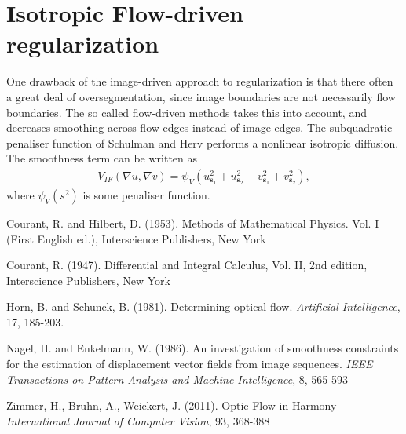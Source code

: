 \documentclass[10pt,a4paper]{article}
\begin{document}
\section{Isotropic Flow-driven regularization}
One drawback of the image-driven approach to regularization is that there often a great deal of oversegmentation, since image boundaries are not necessarily flow boundaries. The so called flow-driven methods takes this into account, and decreases smoothing across flow edges instead of image edges. The subquadratic penaliser function of Schulman and Herv performs a nonlinear isotropic diffusion. The smoothness term can be written as
\begin{align*}
V_{IF}(\nabla u, \nabla v) = \psi_V \left( u_{\textbf{s}_1}^2 + u_{\textbf{s}_2}^2 + v_{\textbf{s}_1}^2 + v_{\textbf{s}_2}^2 \right),
\end{align*} 
where $\psi_V(s^2)$ is some penaliser function.

\begin{thebibliography}{}

Courant, R. and Hilbert, D. (1953). Methods of Mathematical Physics. Vol. I (First English ed.), Interscience Publishers, New York

Courant, R. (1947). Differential and Integral Calculus, Vol. II, 2nd edition, Interscience Publishers, New York


Horn, B. and Schunck, B. (1981). Determining optical flow. \emph{Artificial Intelligence}, 17, 185-203.

Nagel, H. and Enkelmann, W. (1986). An investigation of smoothness constraints for the estimation of displacement vector fields from image sequences. \emph{IEEE Transactions on Pattern Analysis and Machine Intelligence}, 8, 565-593

Zimmer, H., Bruhn, A., Weickert, J. (2011). Optic Flow in Harmony \emph{International Journal of Computer Vision}, 93, 368-388


\end{thebibliography}
\end{document}
